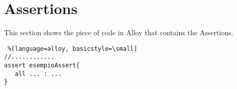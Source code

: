 \section{Assertions}
This section shows the piece of code in Alloy that contains the Assertions.  \\
\begin{lstlisting} %[language=alloy, basicstyle=\small] 
//............
assert esempioAssert{
   all ... : ...
}
\end{lstlisting}








 
 



 
 